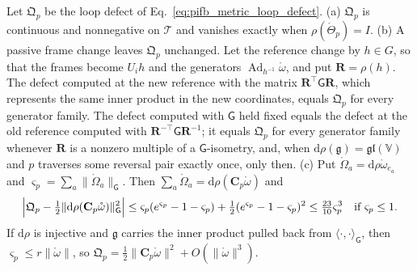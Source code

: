 \begin{proposition}\label{prop:llp_loop_defect}
Let $\mathfrak Q_p$ be the loop defect of Eq.~\eqref{eq:pifb_metric_loop_defect}.
(a) $\mathfrak Q_p$ is continuous and nonnegative on $\mathcal T$ and vanishes exactly when $\rho(\mathring\Theta_p)=I$.
(b) A passive frame change leaves $\mathfrak Q_p$ unchanged. Let the reference change by $h\in G$, so that the frames become $U_ih$ and the generators $\operatorname{Ad}_{h^{-1}}\mathring\omega$, and put $\mathbf R=\rho(h)$. The defect computed at the new reference with the matrix $\mathbf R^\top\mathsf G\mathbf R$, which represents the same inner product in the new coordinates, equals $\mathfrak Q_p$ for every generator family. The defect computed with $\mathsf G$ held fixed equals the defect at the old reference computed with $\mathbf R^{-\top}\mathsf G\mathbf R^{-1}$; it equals $\mathfrak Q_p$ for every generator family whenever $\mathbf R$ is a nonzero multiple of a $\mathsf G$-isometry, and, when $\mathrm d\rho(\mathfrak g)=\mathfrak{gl}(\mathbb V)$ and $p$ traverses some reversal pair exactly once, only then.
(c) Put $\mathring\Omega_a=\mathrm d\rho\mathring\omega_{e_a}$ and $\varsigma_p=\sum_a\|\mathring\Omega_a\|_{\mathsf G}$. Then $\sum_a\mathring\Omega_a=\mathrm d\rho(\mathbf C_p\mathring\omega)$ and
\begin{equation}
\Bigl|\mathfrak Q_p-\tfrac12\|\mathrm d\rho(\mathbf C_p\mathring\omega)\|_{\mathsf G}^2\Bigr|
\leq\varsigma_p(e^{\varsigma_p}-1-\varsigma_p)+\tfrac12(e^{\varsigma_p}-1-\varsigma_p)^2
\leq\tfrac{23}{10}\varsigma_p^3\quad\text{if }\varsigma_p\leq1.
\label{eq:llp_defect_expansion}
\end{equation}
If $\mathrm d\rho$ is injective and $\mathfrak g$ carries the inner product pulled back from $\langle\cdot,\cdot\rangle_{\mathsf G}$, then $\varsigma_p\leq r\|\mathring\omega\|$, so $\mathfrak Q_p=\frac12\|\mathbf C_p\mathring\omega\|^2+O(\|\mathring\omega\|^3)$.
\end{proposition}

